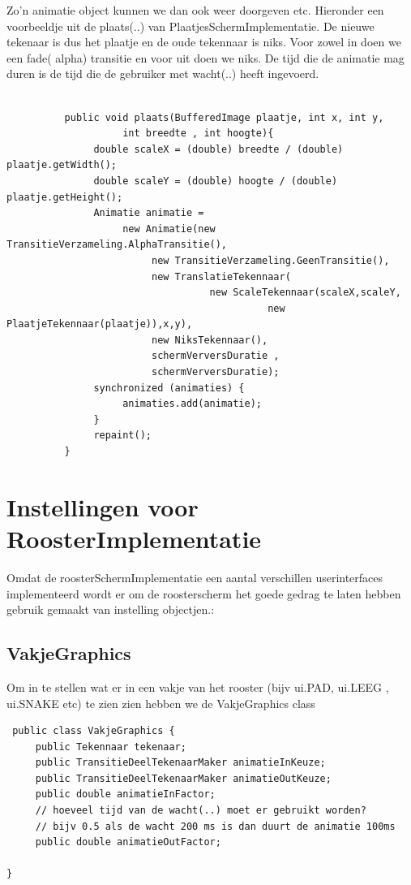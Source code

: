 \documentclass[a4paper,10pt]{article}
\begin{document}
Zo'n animatie object kunnen we dan ook weer doorgeven etc. Hieronder een voorbeeldje uit de plaats(..) van PlaatjesSchermImplementatie. De nieuwe tekenaar is dus het plaatje en de oude tekennaar is niks. Voor zowel in doen we een fade( alpha) transitie en voor uit doen we niks. De tijd die de animatie mag duren is de tijd die de gebruiker met wacht(..) heeft ingevoerd.

\begin{verbatim}
 
          public void plaats(BufferedImage plaatje, int x, int y,
                    int breedte , int hoogte){
               double scaleX = (double) breedte / (double) plaatje.getWidth();
               double scaleY = (double) hoogte / (double) plaatje.getHeight();
               Animatie animatie = 
                    new Animatie(new TransitieVerzameling.AlphaTransitie(), 
                         new TransitieVerzameling.GeenTransitie(), 
                         new TranslatieTekennaar(
                                   new ScaleTekennaar(scaleX,scaleY,
                                             new PlaatjeTekennaar(plaatje)),x,y), 
                         new NiksTekennaar(),
                         schermVerversDuratie , 
                         schermVerversDuratie);
               synchronized (animaties) {
                    animaties.add(animatie);
               }
               repaint();
          }

\end{verbatim}


\section{Instellingen voor RoosterImplementatie}

Omdat de roosterSchermImplementatie een aantal verschillen userinterfaces implementeerd wordt er om de roosterscherm het goede gedrag te laten hebben gebruik gemaakt van instelling objectjen.:

\subsection{VakjeGraphics}

Om in te stellen wat er in een vakje van het rooster (bijv ui.PAD, ui.LEEG , ui.SNAKE etc) te zien zien hebben we de VakjeGraphics class

\begin{verbatim}
 public class VakjeGraphics {
     public Tekennaar tekenaar;
     public TransitieDeelTekenaarMaker animatieInKeuze;
     public TransitieDeelTekenaarMaker animatieOutKeuze;
     public double animatieInFactor; 
     // hoeveel tijd van de wacht(..) moet er gebruikt worden?
     // bijv 0.5 als de wacht 200 ms is dan duurt de animatie 100ms
     public double animatieOutFactor;

}
\end{verbatim}
\end{document}

